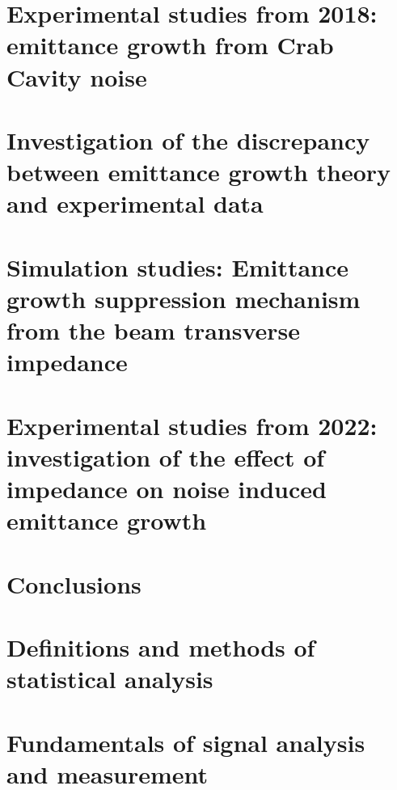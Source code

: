 \documentclass[12pt,twoside]{report} %
\begin{document}
\chapter{Experimental studies from 2018: emittance growth from Crab Cavity noise}\label{Ch:2018_analyisis}


%

\chapter{Investigation of the discrepancy between emittance growth theory and experimental data}\label{Ch:investigating_discrepancy}


\chapter{Simulation studies: Emittance growth suppression mechanism from the beam transverse impedance}\label{Ch:suppression_impedances}\label{Ch:suppression_impedance}


\chapter{Experimental studies from 2022: investigation of the effect of impedance on noise induced emittance growth}\label{Ch:experimental_CC_2022}


\chapter{Conclusions}\label{Ch:conclusions}


\printglossaries
\appendix
\chapter{Definitions and  methods of statistical analysis}\label{ch:app_A}

\chapter{Fundamentals of signal analysis and measurement}\label{ch:app_B}

\end{document}

